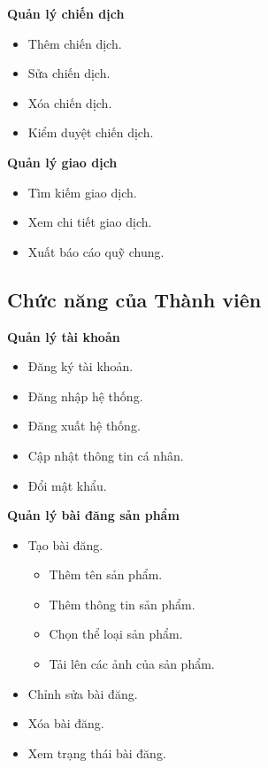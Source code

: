 \documentclass[12pt,a4paper]{report}
\begin{document}
\textbf{Quản lý chiến dịch}
\begin{itemize}[label=--, leftmargin=1.2cm]
\item Thêm chiến dịch.
\item Sửa chiến dịch.
\item Xóa chiến dịch.
\item Kiểm duyệt chiến dịch.
\end{itemize}

\textbf{Quản lý giao dịch}
\begin{itemize}[label=--, leftmargin=1.2cm]
\item Tìm kiếm giao dịch.
\item Xem chi tiết giao dịch.
\item Xuất báo cáo quỹ chung.
\end{itemize}

\subsection{Chức năng của Thành viên}

\textbf{Quản lý tài khoản}
\begin{itemize}[label=--, leftmargin=1.2cm]
\item Đăng ký tài khoản.
\item Đăng nhập hệ thống.
\item Đăng xuất hệ thống.
\item Cập nhật thông tin cá nhân.
\item Đổi mật khẩu.
\end{itemize}

\textbf{Quản lý bài đăng sản phẩm}
\begin{itemize}[label=--, leftmargin=1.2cm]
\item Tạo bài đăng.
\begin{itemize}[label=+, leftmargin=1.5cm]
\item Thêm tên sản phẩm.
\item Thêm thông tin sản phẩm.
\item Chọn thể loại sản phẩm.
\item Tải lên các ảnh của sản phẩm.
\end{itemize}
\item Chỉnh sửa bài đăng.
\item Xóa bài đăng.
\item Xem trạng thái bài đăng.
\end{itemize}
\end{document}
